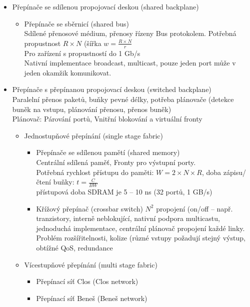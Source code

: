 \documentclass[a4paper, 11pt]{report}
\begin{document}
\begin{itemize}
	\item Přepínače se sdílenou propojovací deskou (shared backplane)
	\begin{itemize}
		\item Přepínače se sběrnicí (shared bus)\\
		Sdílené přenosové médium, přenosy řízeny Bus protokolem. Potřebná propustnost $R \times N$ (šířka $w = \frac{R \times N}{r}$\\
		Pro zařízení s propustností do 1 Gb/s\\
		Nativní implementace broadcast, multicast, pouze jeden port může v jeden okamžik komunikovat.
	\end{itemize}
	\item Přepínače s přepínanou propojovací deskou (switched backplane)\\
	Paralelní přenos paketů, buňky pevné délky, potřeba plánovače (detekce buněk na vstupu, plánování přenosu, přenos buněk)\\
	Plánovač: Párování portů, Vnitřní blokování a virtuální fronty
	\begin{itemize}
		\item Jednostupňové přepínání (single stage fabric)
		\begin{itemize}
			\item Přepínače se sdílenou pamětí (shared memory)\\
			Centrální sdílená paměť, Fronty pro výstupní porty.\\
			Potřebná rychlost přístupu do paměti: $W = 2 \times N \times R$, doba zápisu/čtení buňky: $t = \frac{C}{BW}$\\
			přístupová doba SDRAM je 5 -- 10 ns (32 portů, 1 GB/s)
			\item Křížový přepínač (crossbar switch)
			$N^2$ propojení (on/off -- např. tranzistory, interně neblokující, nativní podpora multicastu, jednoduchá implementace, centrální plánovač propojení každé linky.\\
			Problém rozšířitelnosti, kolize (různé vstupy požadují stejný výstup, obtížné QoS, redundance
		\end{itemize}
		\item Vícestupňové přepínání (multi stage fabric)
		\begin{itemize}
			\item Přepínací síť Clos (Clos network)
			\item Přepínací síť Beneš (Beneš network)
		\end{itemize}
	\end{itemize}
\end{itemize}
\end{document}
